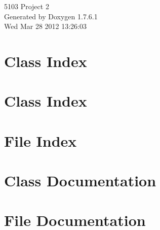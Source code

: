 \documentclass[a4paper]{book}
\begin{document}
\hypersetup{pageanchor=false,citecolor=blue}
\begin{titlepage}
\vspace*{7cm}
\begin{center}
{\Large 5103 \-Project 2 }\\
\vspace*{1cm}
{\large \-Generated by Doxygen 1.7.6.1}\\
\vspace*{0.5cm}
{\small Wed Mar 28 2012 13:26:03}\\
\end{center}
\end{titlepage}
\clearemptydoublepage
{}
\tableofcontents
\clearemptydoublepage
{}
\hypersetup{pageanchor=true,citecolor=blue}
\chapter{\-Class \-Index}

\chapter{\-Class \-Index}

\chapter{\-File \-Index}

\chapter{\-Class \-Documentation}



























\chapter{\-File \-Documentation}











\printindex
\end{document}
